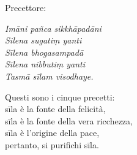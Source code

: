 Precettore:

\textit{Imāni pañca sikkhāpadāni} \\
\textit{Silena sugatiṃ yanti} \\
\textit{Sīlena bhogasampadā} \\
\textit{Sīlena nibbutiṃ yanti} \\
\textit{Tasmā sīlam visodhaye.}

Questi sono i cinque precetti: \\
sīla è la fonte della felicità, \\
sīla è la fonte della vera ricchezza, \\
sīla è l'origine della pace, \\
pertanto, si purifichi sīla.

\endgroup
